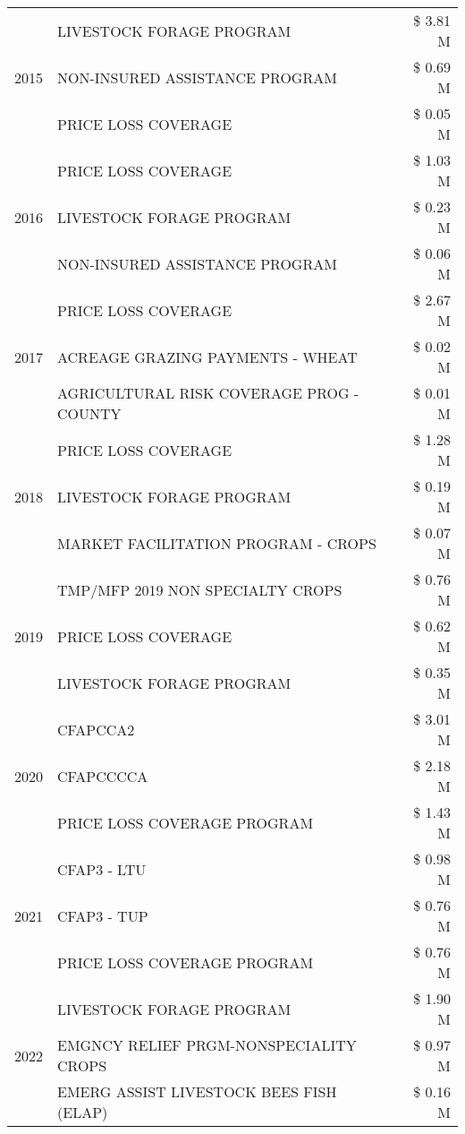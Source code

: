 \begin{tabular}{llr}
\cline{1-3}
\multirow[t]{3}{*}{2015} & LIVESTOCK FORAGE PROGRAM & \$ 3.81 M \\
 & NON-INSURED ASSISTANCE PROGRAM & \$ 0.69 M \\
 & PRICE LOSS COVERAGE & \$ 0.05 M \\
\cline{1-3}
\multirow[t]{3}{*}{2016} & PRICE LOSS COVERAGE & \$ 1.03 M \\
 & LIVESTOCK FORAGE PROGRAM & \$ 0.23 M \\
 & NON-INSURED ASSISTANCE PROGRAM & \$ 0.06 M \\
\cline{1-3}
\multirow[t]{3}{*}{2017} & PRICE LOSS COVERAGE & \$ 2.67 M \\
 & ACREAGE GRAZING PAYMENTS - WHEAT & \$ 0.02 M \\
 & AGRICULTURAL RISK COVERAGE PROG - COUNTY & \$ 0.01 M \\
\cline{1-3}
\multirow[t]{3}{*}{2018} & PRICE LOSS COVERAGE & \$ 1.28 M \\
 & LIVESTOCK FORAGE PROGRAM & \$ 0.19 M \\
 & MARKET FACILITATION PROGRAM - CROPS & \$ 0.07 M \\
\cline{1-3}
\multirow[t]{3}{*}{2019} & TMP/MFP 2019 NON SPECIALTY CROPS & \$ 0.76 M \\
 & PRICE LOSS COVERAGE & \$ 0.62 M \\
 & LIVESTOCK FORAGE PROGRAM & \$ 0.35 M \\
\cline{1-3}
\multirow[t]{3}{*}{2020} & CFAPCCA2 & \$ 3.01 M \\
 & CFAPCCCCA & \$ 2.18 M \\
 & PRICE LOSS COVERAGE PROGRAM & \$ 1.43 M \\
\cline{1-3}
\multirow[t]{3}{*}{2021} & CFAP3 - LTU & \$ 0.98 M \\
 & CFAP3 - TUP & \$ 0.76 M \\
 & PRICE LOSS COVERAGE PROGRAM & \$ 0.76 M \\
\cline{1-3}
\multirow[t]{3}{*}{2022} & LIVESTOCK FORAGE PROGRAM & \$ 1.90 M \\
 & EMGNCY RELIEF PRGM-NONSPECIALITY CROPS & \$ 0.97 M \\
 & EMERG ASSIST LIVESTOCK BEES FISH (ELAP) & \$ 0.16 M \\
\cline{1-3}
\bottomrule
\end{tabular}
